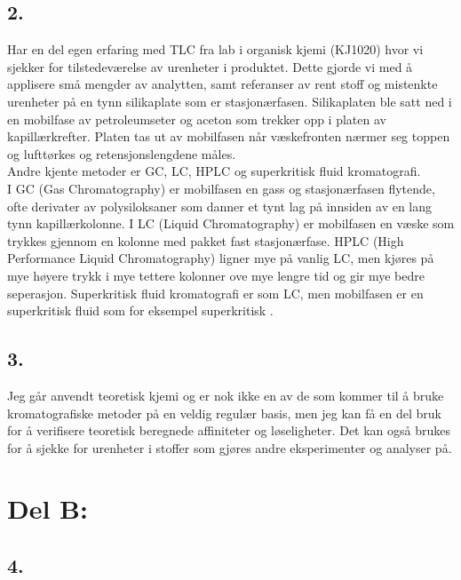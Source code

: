 \subsection*{2.}

Har en del egen erfaring med TLC fra lab i organisk kjemi (KJ1020) hvor vi sjekker for tilstedeværelse av urenheter i produktet. Dette gjorde vi med å applisere små mengder av analytten, samt referanser av rent stoff og mistenkte urenheter på en tynn silikaplate som er stasjonærfasen. Silikaplaten ble satt ned i en mobilfase av petroleumseter og aceton som trekker opp i platen av kapillærkrefter. Platen tas ut av mobilfasen når væskefronten nærmer seg toppen og lufttørkes og retensjonslengdene måles.
\smallskip
\\
Andre kjente metoder er GC, LC, HPLC og superkritisk fluid kromatografi.
\\
I GC (Gas Chromatography) er mobilfasen en gass og stasjonærfasen flytende, ofte derivater av polysiloksaner som danner et tynt lag på innsiden av en lang tynn kapillærkolonne. I LC (Liquid Chromatography) er mobilfasen en væske som trykkes gjennom en kolonne med pakket fast stasjonærfase. HPLC (High Performance Liquid Chromatography) ligner mye på vanlig LC, men kjøres på mye høyere trykk i mye tettere kolonner ove mye lengre tid og gir mye bedre seperasjon. Superkritisk fluid kromatografi er som LC, men mobilfasen er en superkritisk fluid som for eksempel superkritisk .


\subsection*{3.}

Jeg går anvendt teoretisk kjemi og er nok ikke en av de som kommer til å bruke kromatografiske metoder på en veldig regulær basis, men jeg kan få en del bruk for å verifisere teoretisk beregnede affiniteter og løseligheter. Det kan også brukes for å sjekke for urenheter i stoffer som gjøres andre eksperimenter og analyser på.


\section*{Del B:}

\subsection*{4.}

